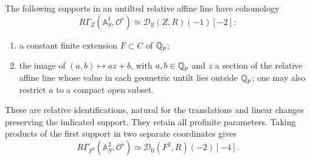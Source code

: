 \begin{lemma}\label{h3:ana:tube-purity}
The following supports in an untilted relative affine line have
cohomology
\[
 R\Gamma_Z(\mathbb A^1_S,\mathcal O^\flat)
   \simeq\mathcal D_{\mathrm{lf}}(Z,R)(-1)[-2]:
\]
\begin{enumerate}[label=\textup{(\roman*)}]
\item a constant finite extension $F\subset C$ of $\mathbb Q_p$;
\item the image of $(a,b)\mapsto az+b$, with $a,b\in\mathbb Q_p$
and $z$ a section of the relative affine line whose value in each
geometric untilt lies outside $\mathbb Q_p$; one may also restrict $a$ to a
compact open subset.
\end{enumerate}
These are relative identifications, natural for the translations
and linear changes preserving the indicated support.  They retain
all profinite parameters.  Taking products of the first support
in two separate coordinates gives
\[
 R\Gamma_{F^2}(\mathbb A^2_S,\mathcal O^\flat)
   \simeq\mathcal D_{\mathrm{lf}}(F^2,R)(-2)[-4].
\]
\end{lemma}
